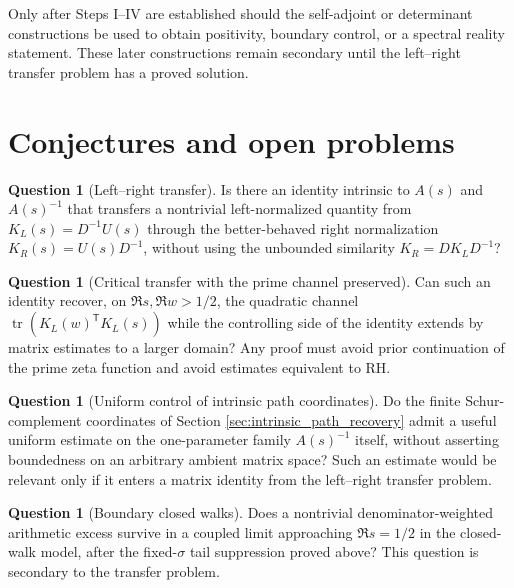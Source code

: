 \documentclass[11pt]{amsart}
\numberwithin{equation}{section}
\theoremstyle{plain}
\theoremstyle{definition}
\newtheorem{question}[theorem]{Question}
\theoremstyle{remark}
\newcommand{\tr}{\operatorname{tr}}
\begin{document}
Only after Steps I--IV are established should the self-adjoint or determinant constructions be used to obtain positivity, boundary control, or a spectral reality statement.  These later constructions remain secondary until the left--right transfer problem has a proved solution.

\section{Conjectures and open problems}
\label{sec:open_problems}

\begin{question}[Left--right transfer]
\label{question:left_right_transfer}
Is there an identity intrinsic to $A(s)$ and $A(s)^{-1}$ that transfers a nontrivial left-normalized quantity from $K_L(s)=D^{-1}U(s)$ through the better-behaved right normalization $K_R(s)=U(s)D^{-1}$, without using the unbounded similarity $K_R=DK_LD^{-1}$?
\end{question}

\begin{question}[Critical transfer with the prime channel preserved]
\label{question:critical_transfer}
Can such an identity recover, on $\Re s,\Re w>1/2$, the quadratic channel $\tr(K_L(w)^{\mathsf T}K_L(s))$ while the controlling side of the identity extends by matrix estimates to a larger domain?  Any proof must avoid prior continuation of the prime zeta function and avoid estimates equivalent to RH.
\end{question}

\begin{question}[Uniform control of intrinsic path coordinates]
\label{question:path_coordinate_control}
Do the finite Schur-complement coordinates of Section \ref{sec:intrinsic_path_recovery} admit a useful uniform estimate on the one-parameter family $A(s)^{-1}$ itself, without asserting boundedness on an arbitrary ambient matrix space?  Such an estimate would be relevant only if it enters a matrix identity from the left--right transfer problem.
\end{question}

\begin{question}[Boundary closed walks]
\label{question:weighted_phase_cancellation}
Does a nontrivial denominator-weighted arithmetic excess survive in a coupled limit approaching $\Re s=1/2$ in the closed-walk model, after the fixed-$\sigma$ tail suppression proved above?  This question is secondary to the transfer problem.
\end{question}
\end{document}
